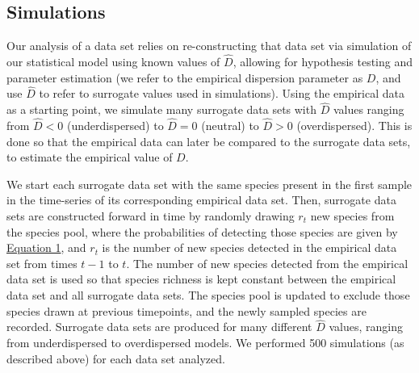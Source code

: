 \documentclass{article}
\begin{document}
\subsection{Simulations} \label{sec:simulations}
Our analysis of a data set relies on re-constructing that data set via simulation of our statistical model using known values of \(\hat{D}\), allowing for hypothesis testing and parameter estimation (we refer to the empirical dispersion parameter as \(D\), and use \(\hat{D}\) to refer to surrogate values used in simulations). Using the empirical data as a starting point, we simulate many surrogate data sets with \(\hat{D}\) values ranging from \(\hat{D}<0\) (underdispersed) to \(\hat{D}=0\) (neutral) to \(\hat{D}>0\) (overdispersed). This is done so that the empirical data can later be compared to the surrogate data sets, to estimate the empirical value of \(D\).
\par
We start each surrogate data set with the same species present in the first sample in the time-series of its corresponding empirical data set. Then, surrogate data sets are constructed forward in time by randomly drawing \(r_t\) new species from the species pool, where the probabilities of detecting those species are given by  \hyperref[sec:equation1]{Equation 1}, and \(r_t\) is the number of new species detected in the empirical data set from times \(t-1\) to \(t\). The number of new species detected from the empirical data set is used so that species richness is kept constant between the empirical data set and all surrogate data sets. The species pool is updated to exclude those species drawn at previous timepoints, and the newly sampled species are recorded. Surrogate data sets are produced for many different \(\hat{D}\) values, ranging from underdispersed to overdispersed models. We performed 500 simulations (as described above) for each data set analyzed.
\end{document}
